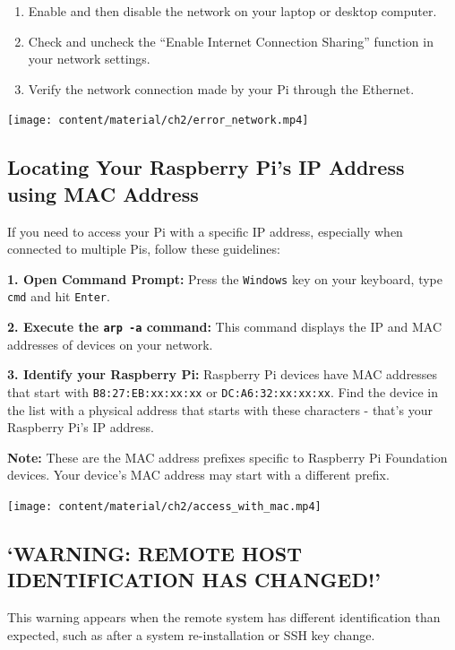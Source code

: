 \documentclass[
  letterpaper,
]{scrbook}
\providecommand{\tightlist}{%
  \setlength{\itemsep}{0pt}\setlength{\parskip}{0pt}}\usepackage{longtable,booktabs,array}
\begin{document}
\begin{enumerate}
\def\labelenumi{\arabic{enumi}.}
\tightlist
\item
  Enable and then disable the network on your laptop or desktop
  computer.
\item
  Check and uncheck the ``Enable Internet Connection Sharing'' function
  in your network settings.
\item
  Verify the network connection made by your Pi through the Ethernet.
\end{enumerate}

\texttt{[image: content/material/ch2/error\_network.mp4]}

\subsection{Locating Your Raspberry Pi's IP Address using MAC
Address}\label{locating-your-raspberry-pis-ip-address-using-mac-address}

If you need to access your Pi with a specific IP address, especially
when connected to multiple Pis, follow these guidelines:

\textbf{1. Open Command Prompt:} Press the \texttt{Windows} key on your
keyboard, type \texttt{cmd} and hit \texttt{Enter}.

\textbf{2. Execute the \texttt{arp\ -a} command:} This command displays
the IP and MAC addresses of devices on your network.

\textbf{3. Identify your Raspberry Pi:} Raspberry Pi devices have MAC
addresses that start with \texttt{B8:27:EB:xx:xx:xx} or
\texttt{DC:A6:32:xx:xx:xx}. Find the device in the list with a physical
address that starts with these characters - that's your Raspberry Pi's
IP address.

\textbf{Note:} These are the MAC address prefixes specific to Raspberry
Pi Foundation devices. Your device's MAC address may start with a
different prefix.

\texttt{[image: content/material/ch2/access\_with\_mac.mp4]}

\subsection{`WARNING: REMOTE HOST IDENTIFICATION HAS
CHANGED!'}\label{warning-remote-host-identification-has-changed}

This warning appears when the remote system has different identification
than expected, such as after a system re-installation or SSH key change.
\end{document}
